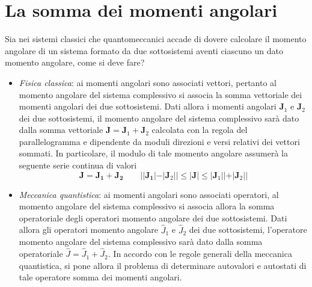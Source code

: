 \section{La somma dei momenti angolari}\label{sec:somma-dei-momenti-angolari}

Sia nei sistemi classici che quantomeccanici accade di dovere calcolare
il momento angolare di un sistema formato da due sottosistemi aventi
ciascuno un dato momento angolare, come si deve fare?

\begin{itemize}
    \tightlist
    \item
    \emph{Fisica classica}: ai momenti angolari sono associati vettori,
    pertanto al momento angolare del sistema complessivo si associa la
    somma vettoriale dei momenti angolari dei due sottosistemi.
    Dati
    allora i momenti angolari \(\bm{J}_{1}\) e \(\bm{J}_{2}\) dei due
    sottosistemi, il momento angolare del sistema complessivo sarà dato
    dalla somma vettoriale \(\bm{J} = \bm{J}_{1}+ \bm{J}_{2}\) calcolata
    con la regola del parallelogramma e dipendente da moduli direzioni e
    versi relativi dei vettori sommati.
    In particolare, il modulo di tale
    momento angolare assumerà la seguente serie continua di valori \[
                                                                        \bm{J} = \bm{J_{1}} + \bm{J_{2}} \qquad | |\bm{J_{1}}| - |\bm{J}_{2}| | \leq | \bm{J}| \leq|\bm{J}_{1} | | + | \bm{J}_{2} | |
    \]
    \item \emph{Meccanica quantistica}: ai momenti angolari sono associati
    operatori, al momento angolare del sistema complessivo si associa
    allora la somma operatoriale degli operatori momento angolare dei due
    sottosistemi.
    Dati allora gli operatori momento angolare
    \(\hat{J}_{1}\) e \(\hat{J}_{2}\) dei due sottosistemi, l'operatore
    momento angolare del sistema complessivo sarà dato dalla somma
    operatoriale \(\hat{J} = \hat{J}_{1}+ \hat{J}_{2}\).
    In accordo con le
    regole generali della meccanica quantistica, si pone allora il
    problema di determinare autovalori e autostati di tale operatore somma
    dei momenti angolari.
\end{itemize}

